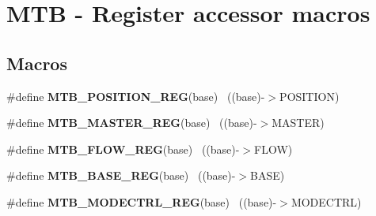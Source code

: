 \hypertarget{group___m_t_b___register___accessor___macros}{}\section{M\+T\+B -\/ Register accessor macros}
\label{group___m_t_b___register___accessor___macros}
\subsection*{Macros}
\begin{DoxyCompactItemize}
\item 
\hypertarget{group___m_t_b___register___accessor___macros_gad0d320e804f2cd189bb8188e5c78eb8d}{}\#define {\bfseries M\+T\+B\+\_\+\+P\+O\+S\+I\+T\+I\+O\+N\+\_\+\+R\+E\+G}(base)                                  ~((base)-\/$>$P\+O\+S\+I\+T\+I\+O\+N)\label{group___m_t_b___register___accessor___macros_gad0d320e804f2cd189bb8188e5c78eb8d}

\item 
\hypertarget{group___m_t_b___register___accessor___macros_ga93dc6f817f5ffb588f1ecbc8bcba05f7}{}\#define {\bfseries M\+T\+B\+\_\+\+M\+A\+S\+T\+E\+R\+\_\+\+R\+E\+G}(base)                                      ~((base)-\/$>$M\+A\+S\+T\+E\+R)\label{group___m_t_b___register___accessor___macros_ga93dc6f817f5ffb588f1ecbc8bcba05f7}

\item 
\hypertarget{group___m_t_b___register___accessor___macros_ga23a937e6a4117d5c9d8f1d6fe2509ba2}{}\#define {\bfseries M\+T\+B\+\_\+\+F\+L\+O\+W\+\_\+\+R\+E\+G}(base)                                          ~((base)-\/$>$F\+L\+O\+W)\label{group___m_t_b___register___accessor___macros_ga23a937e6a4117d5c9d8f1d6fe2509ba2}

\item 
\hypertarget{group___m_t_b___register___accessor___macros_ga537c73869fe3a759f9b1f569af22a322}{}\#define {\bfseries M\+T\+B\+\_\+\+B\+A\+S\+E\+\_\+\+R\+E\+G}(base)                                          ~((base)-\/$>$B\+A\+S\+E)\label{group___m_t_b___register___accessor___macros_ga537c73869fe3a759f9b1f569af22a322}

\item 
\hypertarget{group___m_t_b___register___accessor___macros_ga967e6f251a26507381f8a513847751d2}{}\#define {\bfseries M\+T\+B\+\_\+\+M\+O\+D\+E\+C\+T\+R\+L\+\_\+\+R\+E\+G}(base)                                  ~((base)-\/$>$M\+O\+D\+E\+C\+T\+R\+L)\label{group___m_t_b___register___accessor___macros_ga967e6f251a26507381f8a513847751d2}


\end{DoxyCompactItemize}
